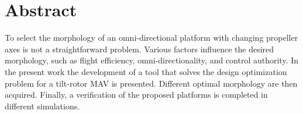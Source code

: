 \chapter*{Abstract}
To select the morphology of an omni-directional platform with changing propeller
axes is not a straightforward problem. Various factors influence the desired
morphology, such as flight efficiency, omni-directionality, and control authority.
In the present work the development of a tool that solves the design optimization
problem for a tilt-rotor MAV is presented. Different optimal morphology are
then acquired. Finally, a verification of the proposed platforms is completed
in different simulations.
